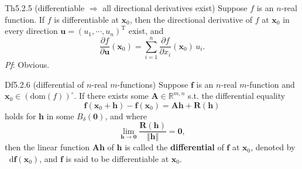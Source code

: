 \documentclass{article}
\newcommand{\parfrac}[2]{\frac{\partial #1}{\partial #2}}
\newcommand{\dif}{\mathop{}\!\mathrm{d}}
\begin{document}
\begin{Th}{Th5.2.5 (differentiable $\Rightarrow$ all directional derivatives exist)}
    Suppose $f$ is an $n$-real function. If $f$ is differentiable at $\pmb{x}_0$, then the directional derivative of $f$ at $\pmb{x}_0$ in every direction $\pmb{u} = (u_1, \cdots, u_n)^\mathrm{T}$ exist, and
    $$ \parfrac{f}{\pmb{u}}(\pmb{x}_0) = \sum_{i=1}^{n} \parfrac{f}{x_i}(\pmb{x}_0)\,u_i. $$
    \tcblower
    \textit{Pf}: Obvious.
\end{Th}

\begin{Df}{Df5.2.6 (differential of $n$-real $m$-functions)}
    Suppose $\pmb{f}$ is an $n$-real $m$-function and $\pmb{x}_0\in (\text{dom}(f))^\circ$. If there exists some $\pmb{A}\in\mathbb{R}^{m,n}$ s.t. the differential equality
    $$ \pmb{f}(\pmb{x}_0 + \pmb{h}) - \pmb{f}(\pmb{x}_0) = \pmb{Ah} + \pmb{R}(\pmb{h}) $$
    holds for $\pmb{h}$ in some $B_\delta(\pmb{0})$, and where 
    $$\lim_{\pmb{h}\to \pmb{0}}\frac{\pmb{R}(\pmb{h})}{\Vert \pmb{h}\Vert} = \pmb{0},$$
    then the linear function $\pmb{Ah}$ of $\pmb{h}$ is called the \textbf{differential} of $\pmb{f}$ at $\pmb{x}_0$, denoted by $\dif \pmb{f}(\pmb{x}_0)$, and $\pmb{f}$ is said to be differentiable at $\pmb{x}_0$.
\end{Df}
\end{document}
